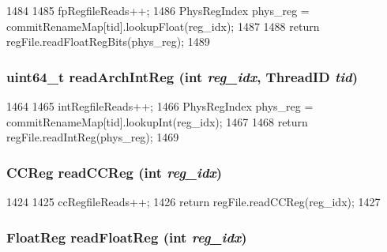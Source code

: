 \begin{DoxyCode}
1484 {
1485     fpRegfileReads++;
1486     PhysRegIndex phys_reg = commitRenameMap[tid].lookupFloat(reg_idx);
1487 
1488     return regFile.readFloatRegBits(phys_reg);
1489 }
\end{DoxyCode}
\hypertarget{classFullO3CPU_a804e1580f078efbacee5689c6a922743}{
\subsubsection[{readArchIntReg}]{\setlength{\rightskip}{0pt plus 5cm}uint64\_\-t readArchIntReg (int {\em reg\_\-idx}, \/  {\bf ThreadID} {\em tid})}}
\label{classFullO3CPU_a804e1580f078efbacee5689c6a922743}



\begin{DoxyCode}
1464 {
1465     intRegfileReads++;
1466     PhysRegIndex phys_reg = commitRenameMap[tid].lookupInt(reg_idx);
1467 
1468     return regFile.readIntReg(phys_reg);
1469 }
\end{DoxyCode}
\hypertarget{classFullO3CPU_ac3d147c535052bfb1f8e8fe0697168d7}{
\subsubsection[{readCCReg}]{\setlength{\rightskip}{0pt plus 5cm}CCReg readCCReg (int {\em reg\_\-idx})}}
\label{classFullO3CPU_ac3d147c535052bfb1f8e8fe0697168d7}



\begin{DoxyCode}
1424 {
1425     ccRegfileReads++;
1426     return regFile.readCCReg(reg_idx);
1427 }
\end{DoxyCode}
\hypertarget{classFullO3CPU_a2f97d83baef4fbda00b7f7f62779752f}{
\subsubsection[{readFloatReg}]{\setlength{\rightskip}{0pt plus 5cm}FloatReg readFloatReg (int {\em reg\_\-idx})}}
\label{classFullO3CPU_a2f97d83baef4fbda00b7f7f62779752f}



